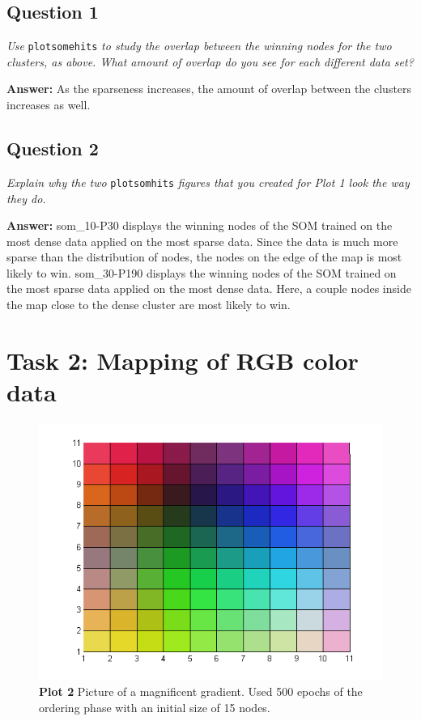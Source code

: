 \documentclass[a4paper]{article}
\begin{document}
\subsection*{Question 1} 

\emph{Use } \texttt{plotsomehits} \emph{ to study the overlap between the winning nodes for the two clusters, as above. What amount of overlap do you see for each different data set?}

\textbf{Answer:} As the sparseness increases, the amount of overlap between the clusters increases as well.


\subsection*{Question 2}
\emph{Explain why the two }\texttt{plotsomhits} \emph{ figures that you created for Plot 1 look the way they do.}

\textbf{Answer:} som\_10-P30 displays the winning nodes of the SOM trained on the most dense data applied on the most sparse data. Since the data is much more sparse than the distribution of nodes, the nodes on the edge of the map is most likely to win. som\_30-P190 displays the winning nodes of the SOM trained on the most sparse data applied on the most dense data. Here, a couple nodes inside the map close to the dense cluster are most likely to win. 


\section*{Task 2: Mapping of RGB color data}

\begin{figure}[H] %
	\includegraphics[]{q2_Order500_15init_500epoch.png}
	\caption{\label{fig:plot1P10onP30}\textbf{Plot 2} Picture of a magnificent gradient. Used 500 epochs of the ordering phase with an initial size of 15 nodes.}
\end{figure}
\end{document}
